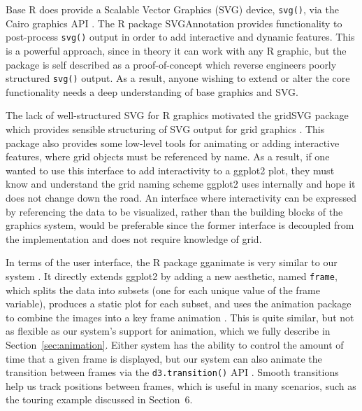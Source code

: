 \documentclass[12pt]{article}\usepackage[]{graphicx}\usepackage[]{color}
\begin{document}
Base R does provide a Scalable Vector Graphics (SVG) device, \texttt{svg()}, 
via the Cairo graphics API \citep{cairo}. The R package SVGAnnotation 
\citep{SVGAnnotation} provides functionality to post-process \texttt{svg()} 
output in order to add interactive and dynamic features. This is a powerful 
approach, since in theory it can work with any R graphic, but the package is 
self described as a proof-of-concept which reverse engineers poorly structured
\texttt{svg()} output. As a result, anyone wishing to extend or alter the 
core functionality needs a deep understanding of base graphics and SVG. 

The lack of well-structured SVG for R graphics motivated the gridSVG package 
which provides sensible structuring of SVG output for grid graphics 
\citep{gridSVG}. This package also provides some low-level tools for animating 
or adding interactive features, where grid objects must be referenced by name.
As a result, if one wanted to use this interface to add interactivity to a 
ggplot2 plot, they must know and understand the grid naming scheme ggplot2 uses 
internally and hope it does not change down the road. An interface where 
interactivity can be expressed by referencing the data to be visualized, 
rather than the building blocks of the graphics system, would be preferable 
since the former interface is decoupled from the implementation and does not 
require knowledge of grid.

In terms of the user interface, the R package gganimate is very similar to our
system \citep{gganimate}. It directly extends ggplot2 by adding a new aesthetic,
named \texttt{frame}, which splits the data into subsets (one for each unique 
value of the frame variable), produces a static plot for each subset, and uses
the animation package to combine the images into a key frame animation 
\citep{animation}. This is quite similar, but not as flexible as our system's
support for animation, which we fully describe in Section~\ref{sec:animation}.
Either system has the ability to control the amount of time that a given frame 
is displayed, but our system can also animate the transition between frames via
the \texttt{d3.transition()} API \citep{d3}. Smooth transitions help us track
positions between frames, which is useful in many scenarios, such as the 
touring example discussed in Section~6.
\end{document}
